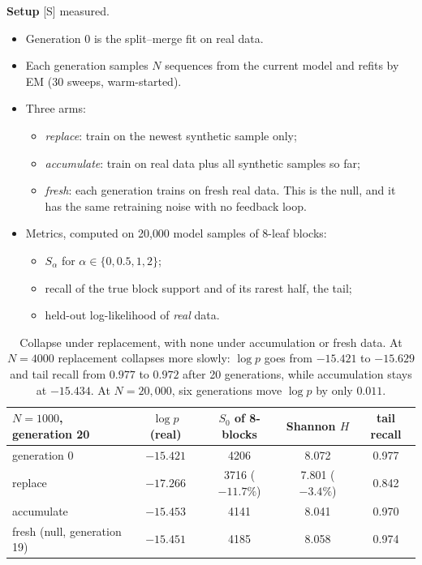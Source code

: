\documentclass[11pt]{article}
\theoremstyle{definition}
\theoremstyle{remark}
\newcommand{\src}[1]{\textsf{\small[#1]}}
\newcommand{\st}[1]{\textsf{\small\color{gray}#1}}
\begin{document}
\textbf{Setup} \src{S} \st{measured}.
\begin{itemize}
  \item Generation 0 is the split--merge fit on real data.
  \item Each generation samples $N$ sequences from the current model and refits by EM (30 sweeps, warm-started).
  \item Three arms:
  \begin{itemize}
    \item \emph{replace}: train on the newest synthetic sample only;
    \item \emph{accumulate}: train on real data plus all synthetic samples so far;
    \item \emph{fresh}: each generation trains on fresh real data. This is the null, and it has the same retraining noise with no feedback loop.
  \end{itemize}
  \item Metrics, computed on 20{,}000 model samples of 8-leaf blocks:
  \begin{itemize}
    \item $S_\alpha$ for $\alpha\in\{0,0.5,1,2\}$;
    \item recall of the true block support and of its rarest half, the tail;
    \item held-out log-likelihood of \emph{real} data.
  \end{itemize}
\end{itemize}
\begin{table}[h]\centering\small
\begin{tabular}{lcccc}
\toprule
$N=1000$, generation 20 & $\log p$ (real) & $S_0$ of 8-blocks & Shannon $H$ & tail recall\\
\midrule
generation 0 & $-15.421$ & 4206 & 8.072 & 0.977\\
replace & $-17.266$ & 3716 ($-11.7\%$) & 7.801 ($-3.4\%$) & 0.842\\
accumulate & $-15.453$ & 4141 & 8.041 & 0.970\\
fresh (null, generation 19) & $-15.451$ & 4185 & 8.058 & 0.974\\
\bottomrule
\end{tabular}
\caption{Collapse under replacement, with none under accumulation or fresh data. At $N=4000$ replacement collapses more slowly: $\log p$ goes from $-15.421$ to $-15.629$ and tail recall from $0.977$ to $0.972$ after 20 generations, while accumulation stays at $-15.434$. At $N=20{,}000$, six generations move $\log p$ by only $0.011$.}
\end{table}
\end{document}
